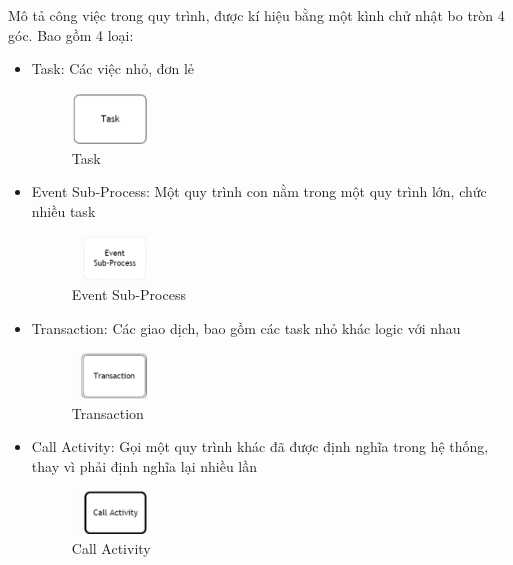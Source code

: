 Mô tả công việc trong quy trình, được kí hiệu bằng một kình chử nhật bo tròn 4 góc. Bao gồm 4 loại:
\begin{itemize}
	\item Task: Các việc nhỏ, đơn lẻ
	      \begin{figure}[!htp]
		      \begin{center}
			      \includegraphics[width=2cm]{img/theory/BPMN/Task.png}
		      \end{center}
		      \caption{Task \cite{theoryBPMN0}}
	      \end{figure}
	\item Event Sub-Process: Một quy trình con nằm trong một quy trình lớn, chức nhiều task
	      \begin{figure}[!htp]
		      \begin{center}
			      \includegraphics[width=2cm]{img/theory/BPMN/Event Sub-process.png}
		      \end{center}
		      \caption{Event Sub-Process \cite{theoryBPMN0}}
	      \end{figure}
	\item Transaction: Các giao dịch, bao gồm các task nhỏ khác logic với nhau
	      \begin{figure}[!htp]
		      \begin{center}
			      \includegraphics[width=2cm]{img/theory/BPMN/Transaction.png}
		      \end{center}
		      \caption{Transaction \cite{theoryBPMN0}}
	      \end{figure}
	\item Call Activity: Gọi một quy trình khác đã được định nghĩa trong hệ thống, thay vì phải định nghĩa lại nhiều lần
	      \begin{figure}[!htp]

		      \begin{center}
			      \includegraphics[width=2cm]{img/theory/BPMN/Call Activity.png}
		      \end{center}
		      \caption{Call Activity \cite{theoryBPMN0}}
	      \end{figure}
\end{itemize}


